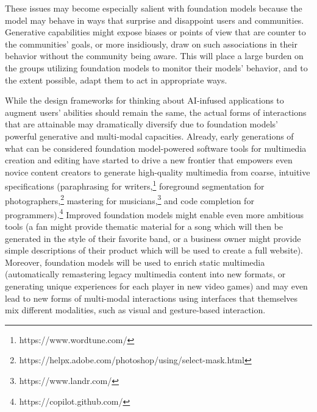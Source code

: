 These issues may become especially salient with foundation models because the model may behave in ways that surprise and disappoint users and communities. Generative capabilities might expose biases or points of view that are counter to the communities' goals, or more insidiously, draw on such associations in their behavior without the community being aware. This will place a large burden on the groups utilizing foundation models to monitor their models' behavior, and to the extent possible, adapt them to act in appropriate ways.

While the design frameworks for thinking about AI-infused applications to augment users' abilities should remain the same, the actual forms of interactions that are attainable may dramatically diversify due to foundation models' powerful generative and multi-modal capacities. Already, early generations of what can be considered foundation model-powered software tools for multimedia creation and editing have started to drive a new frontier that empowers even novice content creators to generate high-quality multimedia from coarse, intuitive specifications (\eg paraphrasing for writers,\footnote{https://www.wordtune.com/} foreground segmentation for photographers,\footnote{https://helpx.adobe.com/photoshop/using/select-mask.html} mastering for musicians,\footnote{https://www.landr.com/} and code completion for programmers).\footnote{https://copilot.github.com/} Improved foundation models might enable even more ambitious tools (\eg a fan might provide thematic material for a song which will then be generated in the style of their favorite band, or a business owner might provide simple descriptions of their product which will be used to create a full website). Moreover, foundation models will be used to enrich static multimedia (\eg automatically remastering legacy multimedia content into new formats, or generating unique experiences for each player in new video games) and may even lead to new forms of multi-modal interactions using interfaces that themselves mix different modalities, such as visual and gesture-based interaction. 

